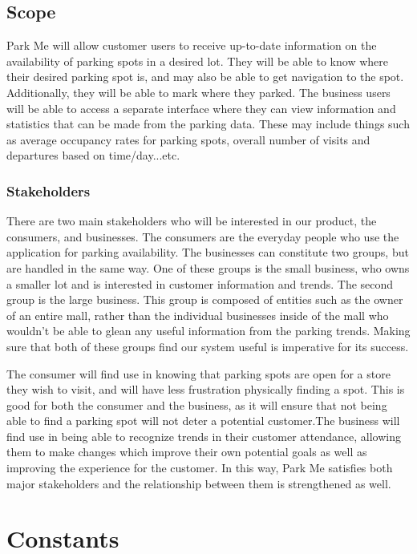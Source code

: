 \documentclass[]{article}
\begin{document}
\subsection{Scope}
Park Me will allow customer users to receive up-to-date information on the availability of parking spots in a desired lot. They will be able to know where their desired parking spot is, and may also be able to get navigation to the spot. Additionally, they will be able to mark where they parked.  The business users will be able to access a separate interface where they can view information and statistics that can be made from the parking data. These may include things such as average occupancy rates for parking spots, overall number of visits and departures based on time/day...etc.

\subsubsection{Stakeholders}
There are two main stakeholders who will be interested in our product, the consumers, and businesses. The consumers are the everyday people who use the application for parking availability. The businesses can constitute two groups, but are handled in the same way. One of these groups is the small business, who owns a smaller lot and is interested in customer information and trends. The second group is the large business. This group is composed of entities such as the owner of an entire mall, rather than the individual businesses inside of the mall who wouldn’t be able to glean any useful information from the parking trends. Making sure that both of these groups find our system useful is imperative for its success.

The consumer will find use in knowing that parking spots are open for a store they wish to visit, and will have less frustration physically finding a spot. This is good for both the consumer and the business, as it will ensure that not being able to find a parking spot will not deter a potential customer.The business will find use in being able to recognize trends in their customer attendance, allowing them to make changes which improve their own potential goals as well as improving the experience for the customer. In this way, Park Me satisfies both major stakeholders and the relationship between them is strengthened as well.

\section{Constants}
\end{document}
